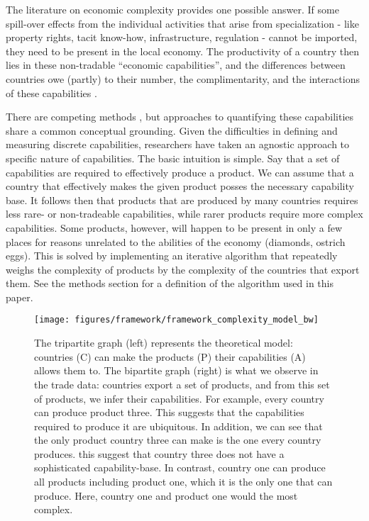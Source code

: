 \documentclass[11pt]{article}
\begin{document}
The literature on economic complexity provides one possible answer. If some spill-over effects from the individual activities that arise from  specialization - like property rights, tacit know-how, infrastructure, regulation - cannot be imported, they need to be present in the local economy. The productivity of a country then lies in these non-tradable ``economic capabilities'', and the differences between countries owe (partly) to their number, the complimentarity, and the interactions of these capabilities \citep{hidalgo_product_2007,hausmann_atlas_2013}.

There are competing methods \citep{tacchella_new_2012,hidalgo_building_2009,inoua_simple_2016}, but approaches to quantifying these capabilities share a common conceptual grounding. Given the difficulties in defining and measuring discrete capabilities, researchers have taken an agnostic approach to specific nature of capabilities. The basic intuition is simple. Say that a set of capabilities are required to effectively produce a product. We can assume that a country that effectively makes the given product posses the necessary capability base. It follows then that products that are produced by many countries requires less rare- or non-tradeable capabilities, while rarer products require more complex capabilities. Some products, however, will happen to be present in only a few places for reasons unrelated to the abilities of the economy (diamonds, ostrich eggs). This is solved by implementing an iterative algorithm that repeatedly weighs the complexity of products by the complexity of the countries that export them. See the methods section for a definition of the algorithm used in this paper.


\begin{figure}[htpb]
  \centering
  \texttt{[image: figures/framework/framework\_complexity\_model\_bw]}
  \caption[The conceptual model behind Economic Complexity]{The tripartite graph (left) represents the theoretical model: countries (C) can make the products (P) their capabilities (A) allows them to. The bipartite graph (right) is what we observe in the trade data: countries export a set of products, and from this set of products, we infer their capabilities. For example, every country can produce product three. This suggests that the capabilities required to produce it are ubiquitous. In addition, we can see that the only product country three can make is the one every country produces. this suggest that country three does not have a sophisticated capability-base. In contrast, country one can produce all products including product one, which it is the only one that can produce. Here, country one and product one would the most complex.}
	\label{fig:complexity-model}
\end{figure}
\end{document}
